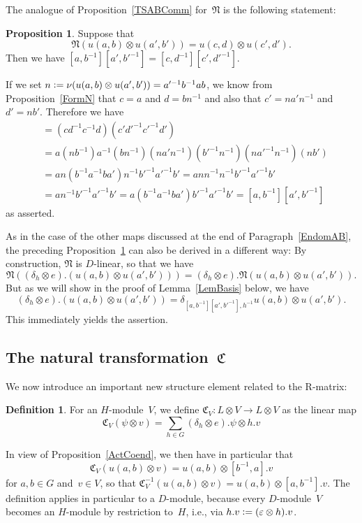 \documentclass[12pt]{article}
\makeatletter
\theoremstyle{definition}
\newtheorem{Proposition}[Satz]{Proposition}
\newtheorem{Definition}[Satz]{Definition}
\theoremstyle{break}
\renewenvironment{proof}[1][\proofname]{\par
\vspace{-5pt}%
\pushQED{\qed}%
\normalfont
\topsep0pt \partopsep0pt %
\trivlist
\item[\hskip\labelsep
\bfseries
#1\@addpunct{.}]\ignorespaces
}{%
\popQED\endtrivlist\@endpefalse
\addvspace{6pt plus 6pt} %
}
\newcommand{\fC}{\mathfrak{C}}
\newcommand{\fN}{\mathfrak{N}}
\renewcommand{\1}{\mathbbm{1}}
\newcommand{\ot}{\mathbin{\otimes}}
\newcommand{\uu}{u}
\newcommand{\n}{\nu}
\newcommand{\deq}{\vcentcolon =}
\makeatother
\begin{document}
The analogue of Proposition~\ref{TSABComm} for~$\fN$ is the following statement:
\begin{Proposition} \label{NComm}
Suppose that
\[\fN(\uu(a,b) \ot \uu(a',b')) = \uu(c,d) \ot \uu(c',d').\]
Then we have $[a,b^{-1}] [a',b'^{-1}] = [c,d^{-1}] [c',d'^{-1}]$.
\end{Proposition}
\begin{proof}
If we set
$n \deq \n(\uu(a,b) \ot \uu(a',b')) = a'^{-1} b^{-1} a b$,
we know from Proposition~\ref{FormN} that
$c = a$ and  $d = b n^{-1}$ and also that $c' = n a' n^{-1}$ and $d' = n b'$.
Therefore we have
\begin{align*}
[c,d^{-1}] [c',d'^{-1}] &= (c d^{-1} c^{-1} d) (c' d'^{-1} c'^{-1} d') \\
&= a (n b^{-1}) a^{-1} (b n^{-1}) (n a' n^{-1}) (b'^{-1} n^{-1}) (n a'^{-1} n^{-1}) (n b')
\\
&= a n (b^{-1} a^{-1} b a') n^{-1} b'^{-1} a'^{-1} b'
= a n n^{-1} n^{-1} b'^{-1} a'^{-1} b' \\
&= a n^{-1} b'^{-1} a'^{-1} b' = a (b^{-1} a^{-1} b a') b'^{-1} a'^{-1} b'
= [a,b^{-1}] [a',b'^{-1}]
\end{align*}
as asserted.
\end{proof}

As in the case of the other maps discussed at the end of Paragraph~\ref{EndomAB}, the preceding Proposition~\ref{NComm} can also be derived in a different way: By construction, $\fN$ is \mbox{$D$-linear}, so that we have
\[\fN((\delta_h \ot e).(\uu(a,b) \ot \uu(a',b'))) =
(\delta_h \ot e).\fN(\uu(a,b) \ot \uu(a',b')).\]
But as we will show in the proof of Lemma~\ref{LemBasis} below, we have
\[(\delta_h \ot e).(\uu(a,b) \ot \uu(a',b')) =
\delta_{[a,b^{-1}] [a',b'^{-1}], h^{-1}} \uu(a,b) \ot \uu(a',b').\]
This immediately yields the assertion.


\subsection{The natural transformation~$\fC$} \label{NatTrC}
We now introduce an important new structure element related to the R-matrix:
\begin{Definition} \label{DefC}
For an $H$-module~$V$, we define $\fC_V \colon L \ot V \to L \ot V$ as the linear map
\[\fC_V(\psi \ot v) = \sum_{h \in G} (\delta_h \ot e).\psi \ot h.v\]
\end{Definition}
In view of Proposition~\ref{ActCoend}, we then have in particular that
\[\fC_V(\uu(a, b) \ot v) = \uu(a, b) \ot [b^{-1}, a].v\]
for $a,b \in G$ and~$v \in V$, so that
$\fC_V^{-1}(\uu(a, b) \ot v) = \uu(a, b) \ot [a, b^{-1}].v$. The definition applies in particular to a $D$-module, because every $D$-module~$V$ becomes an \mbox{$H$-module} by restriction to~$H$, i.e., via $h.v \deq (\varepsilon \ot h).v$.
\end{document}
